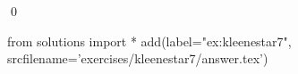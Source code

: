 
\begin{ex} 
  \label{ex:kleenestar7}
  
  \qed
\end{ex} 
\begin{python0}
from solutions import *
add(label="ex:kleenestar7",
    srcfilename='exercises/kleenestar7/answer.tex') 
\end{python0}
